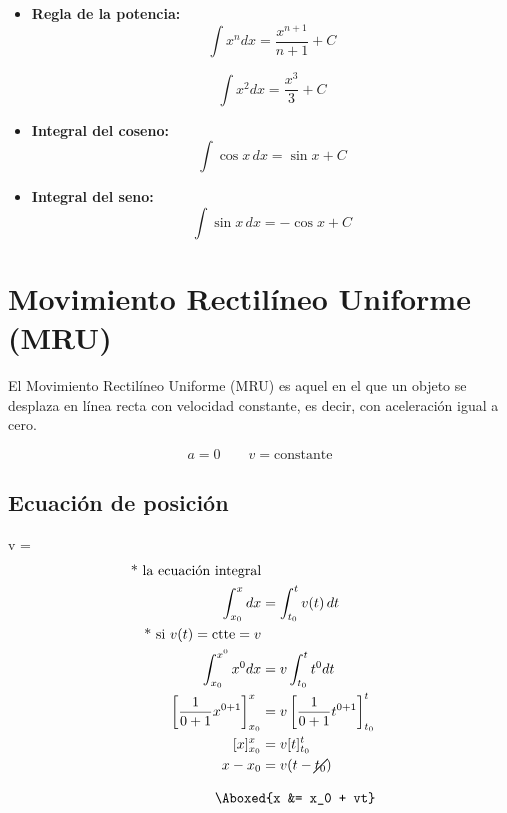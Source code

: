 \begin{itemize}

\item \textbf{Regla de la potencia:}
\[
\int x^n dx = \frac{x^{n+1}}{n+1} + C
\]

\[
\int x^2 dx = \frac{x^3}{3} + C
\]

\item \textbf{Integral del coseno:}
\[
\int \cos x \, dx = \sin x + C
\]

\item \textbf{Integral del seno:}
\[
\int \sin x \, dx = -\cos x + C
\]

\end{itemize}


\section{Movimiento Rectilíneo Uniforme (MRU)}

El Movimiento Rectilíneo Uniforme (MRU) es aquel en el que un objeto se desplaza en línea recta con velocidad constante, es decir, con aceleración igual a cero.
\vspace{-20pt}

\[
a = 0 \qquad v = \text{constante}
\]

\subsection{Ecuación de posición}

{v} =  \quad {}
\begin{align*}
\text{* la ecuación integral}\\
\int_{x_0}^{x} dx &= \int_{t_0}^{t} v(t)\, dt\\
\text{* si } v(t)=\text{ctte}=v\\
\int_{x_0}^{{x^0}} {x^0} dx &= v \int_{t_0}^{t} {t^0} dt\\
\left[\frac{1}{0+1}x^{0+1} \right]_{x_0}^{x} &= v\left[\frac{1}{0+1}t^{0+1}\right]_{t_0}^{t}\\
[x]_{x_0}^{x} &= v[t]_{t_0}^{t}\\
x - x_0 &= v(t - \cancel{t_0})\\
\end{align*}

\vspace{-60pt}

\begin{align*}
    \hspace{1.8cm} \Aboxed{x &= x_0 + vt}
\end{align*}

